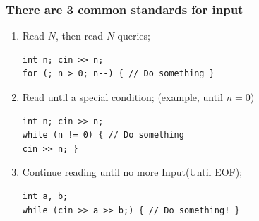\begin{frame}[fragile]
  \frametitle{There are 3 common standards for input}

  \begin{enumerate}
  \item Read $N$, then read $N$ queries;
\begin{verbatim}
int n; cin >> n;
for (; n > 0; n--) { // Do something }
\end{verbatim}
\item Read until a special condition; (example, until $n = 0$)
\begin{verbatim}
int n; cin >> n;
while (n != 0) { // Do something
cin >> n; }
\end{verbatim}
  \item Continue reading until no more Input\hfil (Until EOF);
\begin{verbatim}
int a, b;
while (cin >> a >> b;) { // Do something! }
\end{verbatim}
  \end{enumerate}
\end{frame}

